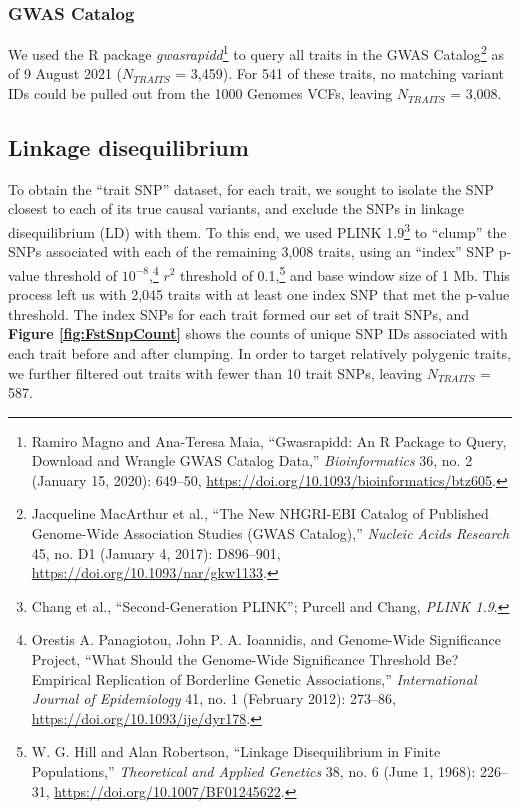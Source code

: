\documentclass[
]{book}
\begin{document}
\hypertarget{gwas-catalog}{%
\subsubsection{GWAS Catalog}\label{gwas-catalog}}

We used the R package \emph{gwasrapidd}\footnote{Ramiro Magno and Ana-Teresa Maia, {``Gwasrapidd: An {R} Package to Query, Download and Wrangle {GWAS} Catalog Data,''} \emph{Bioinformatics} 36, no. 2 (January 15, 2020): 649--50, \url{https://doi.org/10.1093/bioinformatics/btz605}.} to query all traits in the GWAS Catalog\footnote{Jacqueline MacArthur et al., {``The New {NHGRI-EBI Catalog} of Published Genome-Wide Association Studies ({GWAS Catalog}),''} \emph{Nucleic Acids Research} 45, no. D1 (January 4, 2017): D896--901, \url{https://doi.org/10.1093/nar/gkw1133}.} as of 9 August 2021 (\(N_{TRAITS}\) = 3,459). For 541 of these traits, no matching variant IDs could be pulled out from the 1000 Genomes VCFs, leaving \(N_{TRAITS}\) = 3,008.

\hypertarget{linkage-disequilibrium}{%
\subsection{Linkage disequilibrium}\label{linkage-disequilibrium}}

To obtain the ``trait SNP'' dataset, for each trait, we sought to isolate the SNP closest to each of its true causal variants, and exclude the SNPs in linkage disequilibrium (LD) with them. To this end, we used PLINK 1.9\footnote{Chang et al., {``Second-Generation {PLINK}''}; Purcell and Chang, \emph{{PLINK} 1.9}.} to ``clump'' the SNPs associated with each of the remaining 3,008 traits, using an ``index'' SNP p-value threshold of \(10^{-8}\),\footnote{Orestis A. Panagiotou, John P. A. Ioannidis, and Genome-Wide Significance Project, {``What Should the Genome-Wide Significance Threshold Be? {Empirical} Replication of Borderline Genetic Associations,''} \emph{International Journal of Epidemiology} 41, no. 1 (February 2012): 273--86, \url{https://doi.org/10.1093/ije/dyr178}.} \(r^2\) threshold of 0.1,\footnote{W. G. Hill and Alan Robertson, {``Linkage Disequilibrium in Finite Populations,''} \emph{Theoretical and Applied Genetics} 38, no. 6 (June 1, 1968): 226--31, \url{https://doi.org/10.1007/BF01245622}.} and base window size of 1 Mb. This process left us with 2,045 traits with at least one index SNP that met the p-value threshold. The index SNPs for each trait formed our set of trait SNPs, and \textbf{Figure \ref{fig:FstSnpCount}} shows the counts of unique SNP IDs associated with each trait before and after clumping. In order to target relatively polygenic traits, we further filtered out traits with fewer than 10 trait SNPs, leaving \(N_{TRAITS}\) = 587.
\end{document}
